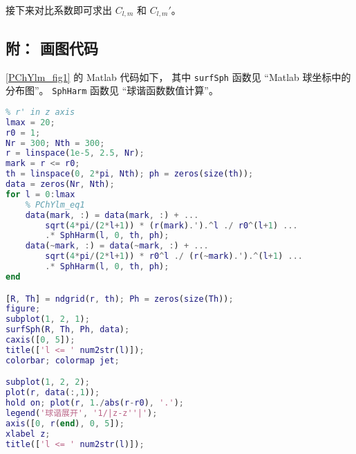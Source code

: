 接下来对比系数即可求出 $C_{l,m}$ 和 $C_{l,m}'$。

\subsection{附： 画图代码}
\autoref{PChYlm_fig1} 的 Matlab 代码如下， 其中 \verb|surfSph| 函数见 “Matlab 球坐标中的分布图”。 \verb|SphHarm| 函数见 “球谐函数数值计算”。
\begin{lstlisting}[language=matlab, caption=Ylm\_Coul\_exp.m]
% expansion of 1/|r-r'| into Y_lm
% r' in z axis
lmax = 20;
r0 = 1;
Nr = 300; Nth = 300;
r = linspace(1e-5, 2.5, Nr);
mark = r <= r0;
th = linspace(0, 2*pi, Nth); ph = zeros(size(th));
data = zeros(Nr, Nth);
for l = 0:lmax
    % PChYlm_eq1
    data(mark, :) = data(mark, :) + ...
        sqrt(4*pi/(2*l+1)) * (r(mark).').^l ./ r0^(l+1) ...
        .* SphHarm(l, 0, th, ph);
    data(~mark, :) = data(~mark, :) + ...
        sqrt(4*pi/(2*l+1)) * r0^l ./ (r(~mark).').^(l+1) ...
        .* SphHarm(l, 0, th, ph);
end

[R, Th] = ndgrid(r, th); Ph = zeros(size(Th));
figure;
subplot(1, 2, 1);
surfSph(R, Th, Ph, data);
caxis([0, 5]);
title(['l <= ' num2str(l)]);
colorbar; colormap jet;

subplot(1, 2, 2);
plot(r, data(:,1));
hold on; plot(r, 1./abs(r-r0), '.');
legend('球谐展开', '1/|z-z''|');
axis([0, r(end), 0, 5]);
xlabel z;
title(['l <= ' num2str(l)]);
\end{lstlisting}

